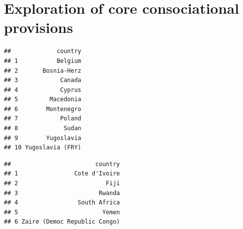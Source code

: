 \documentclass[
]{article}
\newenvironment{Shaded}{\begin{snugshade}}{\end{snugshade}}
\newcommand{\CommentTok}[1]{\textcolor[rgb]{0.56,0.35,0.01}{\textit{#1}}}
\newcommand{\DecValTok}[1]{\textcolor[rgb]{0.00,0.00,0.81}{#1}}
\newcommand{\KeywordTok}[1]{\textcolor[rgb]{0.13,0.29,0.53}{\textbf{#1}}}
\newcommand{\NormalTok}[1]{#1}
\newcommand{\OperatorTok}[1]{\textcolor[rgb]{0.81,0.36,0.00}{\textbf{#1}}}
\newcommand{\StringTok}[1]{\textcolor[rgb]{0.31,0.60,0.02}{#1}}
\begin{document}
\hypertarget{exploration-of-core-consociational-provisions}{%
\section{Exploration of core consociational
provisions}\label{exploration-of-core-consociational-provisions}}

\begin{Shaded}
\end{Shaded}

\begin{verbatim}
##             country
## 1           Belgium
## 2       Bosnia-Herz
## 3            Canada
## 4            Cyprus
## 5         Macedonia
## 6        Montenegro
## 7            Poland
## 8             Sudan
## 9        Yugoslavia
## 10 Yugoslavia (FRY)
\end{verbatim}

\begin{Shaded}
\end{Shaded}

\begin{verbatim}
##                        country
## 1                Cote d'Ivoire
## 2                         Fiji
## 3                       Rwanda
## 4                 South Africa
## 5                        Yemen
## 6 Zaire (Democ Republic Congo)
\end{verbatim}

\begin{Shaded}
\end{Shaded}
\end{document}
